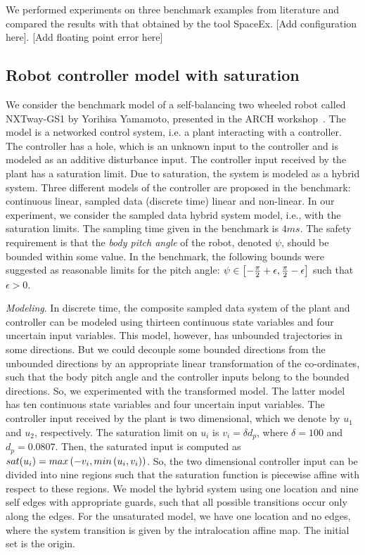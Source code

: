 We performed experiments on three benchmark examples from literature
and compared the results with that obtained by the tool SpaceEx. [Add
  configuration here]. [Add floating point error here]

\subsection{Robot controller model with saturation}   We consider the benchmark
model of a self-balancing two wheeled robot called NXTway-GS1 by
Yorihisa Yamamoto, presented in the ARCH workshop~\cite{TODO}.  The
model is a networked control system, i.e. a plant interacting with a
controller.  The controller has a hole, which is an unknown input to
the controller and is modeled as an additive disturbance input.  The
controller input received by the plant has a saturation limit.  Due to
saturation, the system is modeled as a hybrid system.  Three different
models of the controller are proposed in the benchmark: continuous
linear, sampled data (discrete time) linear and non-linear.  In our
experiment, we consider the sampled data hybrid system model, i.e.,
with the saturation limits.  The sampling time given in the benchmark
is $4 ms$.  The safety requirement is that the \emph{body pitch angle}
of the robot, denoted $\psi$, should be bounded within some value. In
the benchmark, the following bounds were suggested as reasonable
limits for the pitch angle:
$\psi\in\left[-\frac{\pi}{2}+\epsilon,\frac{\pi}{2}-\epsilon\right]$ such
that $\epsilon>0$.

\emph{Modeling}.  In discrete time, the composite sampled data system
of the plant and controller can be modeled using thirteen continuous
state variables and four uncertain input variables.  This model,
however, has unbounded trajectories in some directions.  But we could
decouple some bounded directions from the unbounded directions by an
appropriate linear transformation of the co-ordinates, such that the
body pitch angle and the controller inputs belong to the bounded
directions.  So, we experimented with the transformed model.  The
latter model has ten continuous state variables and four uncertain
input variables. The controller input received by the plant is two
dimensional, which we denote by $u_1$ and $u_2$, respectively.  The
saturation limit on $u_i$ is $v_i=\delta d_p$, where $\delta=100$ and
$d_p=0.0807$.  Then, the saturated input is computed as $sat(u_i) =
max\left(-v_i,min\left(u_i,v_i\right)\right)$.  So, the two dimensional
controller input can be divided into nine regions such that the
saturation function is piecewise affine with respect to these regions.
We model the hybrid system using one location and nine self edges with
appropriate guards, such that all possible transitions occur only
along the edges.  For the unsaturated model, we have one location and
no edges, where the system transition is given by the intralocation
affine map.  The initial set is the origin.


